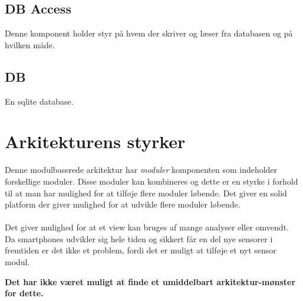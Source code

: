 \subsection*{DB Access}
Denne komponent holder styr på hvem der skriver og læser fra databasen og på hvilken måde.

\subsection*{DB}
En sqlite database.

\section*{Arkitekturens styrker}
Denne modulbaserede arkitektur har \textit{moduler} komponenten som indeholder forskellige moduler.
Disse moduler kan kombineres og dette er en styrke i forhold til at man har mulighed for at tilføje flere moduler løbende.
Det giver en solid platform der giver mulighed for at udvikle flere moduler løbende.
\\
\\
Det giver mulighed for at et view kan bruges af mange analyser eller omvendt.
Da smartphones udvikler sig hele tiden og sikkert får en del nye sensorer i fremtiden er det ikke et problem, fordi det er muligt at tilføje et nyt sensor modul.

\textbf{Det har ikke været muligt at finde et umiddelbart arkitektur-mønster for dette.}